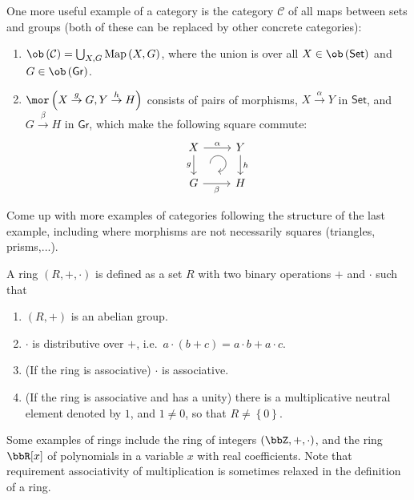 %
\begin{example}
One more useful example of a category is the category $\mathcal{C}$
of all maps between sets and groups (both of these can be replaced
by other concrete categories):
\begin{enumerate}
\item $\ob\left(\mathcal{C}\right)=\bigcup_{X,G}\mathrm{Map}\left(X,G\right)$,
where the union is over all $X\in\ob\left(\mathsf{Set}\right)$ and
$G\in\ob\left(\mathsf{Gr}\right)$.
\item $\mor\left(X\overset{g}{\to}G,Y\overset{h}{\to}H\right)$ consists
of pairs of morphisms, $X\overset{\alpha}{\to}Y$ in $\mathsf{Set}$,
and $G\overset{\beta}{\to}H$ in $\mathsf{Gr}$, which make the following
square commute: \[\begin{tikzcd}[every matrix/.append style={name=m},   
execute at end picture={\draw [<-] ([xshift=-2em,yshift=1mm]m-2-2.north) arc[start angle=-90,delta angle=270,radius=0.25cm];}]
   X \arrow[r,"\alpha"]\arrow[d,swap,"g"]& Y\arrow[d,"h"] \\
   G\arrow[r,swap,"\beta"]& H
\end{tikzcd}\]
\end{enumerate}
\end{example}
\begin{xca}
Come up with more examples of categories following the structure of
the last example, including where morphisms are not necessarily squares
(triangles, prisms,...).
\end{xca}
\begin{defn}[Rings]
A ring $(R,+,\cdot)$ is defined as a set $R$ with two binary operations
$+$ and $\cdot$ such that 
\begin{enumerate}
\item $(R,+)$ is an abelian group.
\item $\cdot$ is distributive over $+$, i.e.\ $a\cdot(b+c)=a\cdot b+a\cdot c$.
\item (If the ring is associative) $\cdot$ is associative.
\item (If the ring is associative and has a unity) there is a multiplicative
neutral element denoted by $1$, and $1\neq0$, so that $R\neq\left\{ 0\right\} $.
\end{enumerate}
\end{defn}
Some examples of rings include the ring of integers $(\bbZ,+,\cdot)$,
and the ring $\bbR [x]$ of polynomials in a variable $x$ with
real coefficients. Note that requirement associativity of multiplication
is sometimes relaxed in the definition of a ring.

